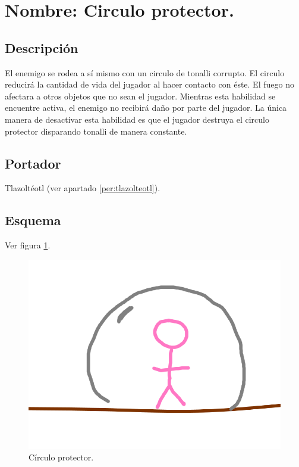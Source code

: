 \section{Nombre: Circulo protector.} \label{hab.CirPro}
\subsection{Descripción}
El enemigo se rodea a sí mismo con un circulo de tonalli corrupto. El circulo reducirá la cantidad de vida del jugador al hacer contacto con éste. El fuego no afectara a otros objetos que no sean el jugador. Mientras esta habilidad se encuentre activa, el enemigo no recibirá daño por parte del jugador. La única manera de desactivar esta habilidad es que el jugador destruya el circulo protector disparando tonalli de manera constante. 
\subsection{Portador}
Tlazoltéotl (ver apartado \ref{per:tlazolteotl}).
\subsection{Esquema}
			Ver figura \ref{fig:circuloP}.
			\begin{figure}
				\centering
				\includegraphics[height=0.2 \textheight]{Imagenes/circuloP}
				\caption{Círculo protector.}
				\label{fig:circuloP}
			\end{figure}

